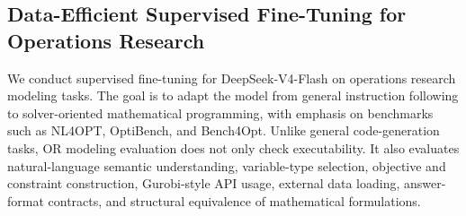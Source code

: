 



\subsection{Data-Efficient Supervised Fine-Tuning for Operations Research}
\label{sec:sft}

We conduct supervised fine-tuning for DeepSeek-V4-Flash on operations research modeling tasks. The goal is to adapt the model from general instruction following to solver-oriented mathematical programming, with emphasis on benchmarks such as NL4OPT, OptiBench, and Bench4Opt. Unlike general code-generation tasks, OR modeling evaluation does not only check executability. It also evaluates natural-language semantic understanding, variable-type selection, objective and constraint construction, Gurobi-style API usage, external data loading, answer-format contracts, and structural equivalence of mathematical formulations.

